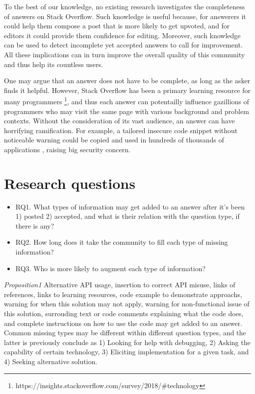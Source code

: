 \documentclass[10pt,conference]{IEEEtran}
\begin{document}
To the best of our knowledge, no existing research investigates the completeness of answers on Stack Overflow. Such knowledge is useful because, for answerers it could help them compose a post that is more likely to get upvoted, and for editors it could provide them confidence for editing. Moreover, such knowledge can be used to detect incomplete yet accepted answers to call for improvement. All these implications can in turn improve the overall quality of this community and thus help its countless users.

One may argue that an answer does not have to be complete, as long as the asker finds it helpful. However, Stack Overflow has been a primary learning resource for many programmers \footnote{https://insights.stackoverflow.com/survey/2018/\#technology}, and thus each answer can potentailly influence gazillions of programmers who may visit the same page with various background and problem contexts. Without the consideration of its vast audience, an answer can have horrifying ramification. For example, a tailored insecure code snippet without noticeable warning could be copied and used in hundreds of thousands of applications \cite{DBLP:conf/sp/FischerBXSA0F17}, raising big security concern. 

\section {Research questions}
\begin{itemize}
  \item RQ1. What types of information may get added to an answer after it's been 1) posted 2) accepted, and what is their relation with the question type, if there is any?
  \item RQ2. How long does it take the community to fill each type of missing information?
  \item RQ3. Who is more likely to augment each type of information?
\end{itemize}

{\em Proposition1} 
Alternative API usage, insertion to correct API misuse, links of references, links to learning resources, code example to demonstrate approachs, warning for when this solution may not apply, warning for non-functional issue of this solution, surrouding text or code comments explaining what the code does, and complete instructions on how to use the code may get added to an answer. Common missing types may be different within different question types, and the latter is previously conclude as 1) Looking for help with debugging, 2) Asking the capability of certain technology, 3) Eliciting implementation for a given task, and 4) Seeking alternative solution. \cite{DBLP:conf/icsm/NasehiSMB12}   
\end{document}
